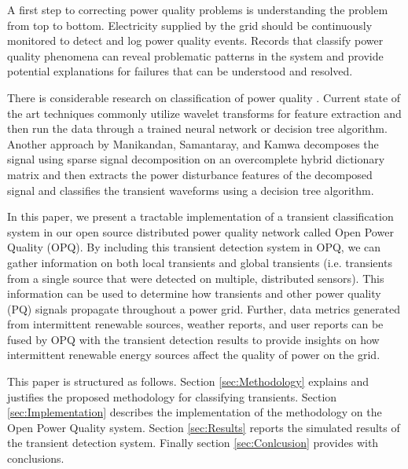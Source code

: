 \documentclass[10pt, conference, compsocconf]{IEEEtran}
\begin{document}
A first step to correcting power quality problems is understanding the problem from top to bottom. Electricity supplied by the grid should be continuously monitored to detect and log power quality events. Records that classify power quality phenomena can reveal problematic patterns in the system and provide potential explanations for failures that can be understood and resolved.

There is considerable research on classification of power quality \cite{Garrido:2014:PhenomenaClassification, Manikandan:2014:PQClassificationUsingSSD, Thirumala:2016:PQClassificationUsingWavelet, Rodriguez:2014:PQClassificationUsingANN, Tse:2012:PQClassificationUsingHHT}. Current state of the art techniques commonly utilize wavelet transforms for feature extraction and then run the data through a trained neural network or decision tree algorithm.  Another approach by Manikandan, Samantaray, and Kamwa \cite{Manikandan:2014:PQClassificationUsingSSD} decomposes the signal using sparse signal decomposition on an overcomplete hybrid dictionary matrix and then extracts the power disturbance features of the decomposed signal and classifies the transient waveforms using a decision tree algorithm.

In this paper, we present a tractable implementation of a transient classification system in our open source distributed power quality network called Open Power Quality (OPQ). By including this transient detection system in OPQ, we can gather information on both local transients and global transients (i.e. transients from a single source that were detected on multiple, distributed sensors). This information can be used to determine how transients and other power quality (PQ) signals propagate throughout a power grid. Further, data metrics generated from intermittent renewable sources, weather reports, and user reports can be fused by OPQ with the transient detection results to provide insights on how intermittent renewable energy sources affect the quality of power on the grid.

This paper is structured as follows. Section \ref{sec:Methodology} explains and justifies the proposed methodology for classifying transients. Section \ref{sec:Implementation} describes the implementation of the methodology on the Open Power Quality system. Section \ref{sec:Results} reports the simulated results of the transient detection system. Finally section \ref{sec:Conlcusion} provides with conclusions.

\end{document}
